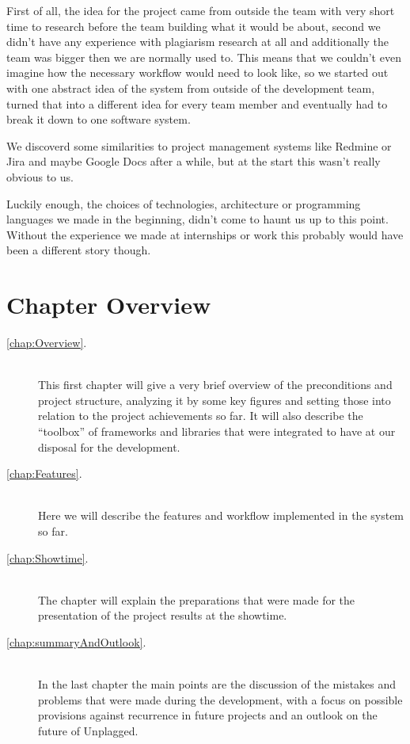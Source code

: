First of all, the idea for the project came from outside the team with very short time to research before the team building what it would be 
about, second we didn't have any experience with plagiarism research at all and additionally the team was bigger then we are normally used to. 
This means that we couldn't even imagine how the necessary workflow would need to look like, so we started out with one abstract idea of the system 
from outside of the development team, turned that into a different idea for every team member and eventually had to break it down to one software system.

We discoverd some similarities to project management systems like Redmine or Jira and maybe Google Docs after a while, but at the start this wasn't really obvious to us.

Luckily enough, the choices of technologies, architecture or programming languages we made in the beginning, didn't come to haunt us up to this point. Without the experience we made at internships or work this probably would have been a different story though.

\section*{Chapter Overview}

\begin{description}
\item[\ref{chap:Overview}. ] \hfill \\
This first chapter will give a very brief overview of the preconditions and project structure, analyzing it by some key figures and setting those into relation to the project achievements so far. It will also describe the \enquote{toolbox} of
frameworks and libraries that were integrated to have at our disposal for the development.
\item[\ref{chap:Features}. ] \hfill \\
Here we will describe the features and workflow implemented in the system so far.
\item[\ref{chap:Showtime}. ] \hfill \\
The chapter  will explain the preparations that were made for the presentation of the project results at the showtime.
\item[\ref{chap:summaryAndOutlook}. ] \hfill \\
In the last chapter the main points are the discussion of the mistakes and
problems that were made during the development, with a focus on possible provisions against recurrence in future projects and an
outlook on the future of Unplagged.
\end{description}

